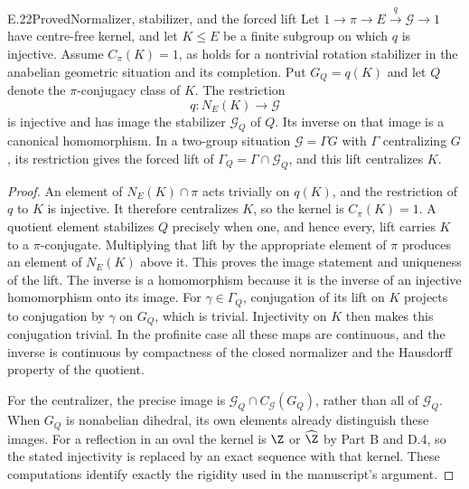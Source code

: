 \begin{claim}{E.22}{Proved}{Normalizer, stabilizer, and the forced lift}
Let $1\to\pi\to E\xrightarrow q\mathcal G\to1$ have centre-free kernel, and let $K\leq E$ be a finite subgroup on which $q$ is injective. Assume $C_\pi(K)=1$, as holds for a nontrivial rotation stabilizer in the anabelian geometric situation and its completion. Put $G_Q=q(K)$ and let $Q$ denote the $\pi$-conjugacy class of $K$. The restriction
\[
 q:N_E(K)\longrightarrow\mathcal G
\]
is injective and has image the stabilizer $\mathcal G_Q$ of $Q$. Its inverse on that image is a canonical homomorphism. In a two-group situation $\mathcal G=\Gamma G$ with $\Gamma$ centralizing $G$, its restriction gives the forced lift of $\Gamma_Q=\Gamma\cap\mathcal G_Q$, and this lift centralizes $K$.
\end{claim}
\begin{proof}
An element of $N_E(K)\cap\pi$ acts trivially on $q(K)$, and the restriction of $q$ to $K$ is injective. It therefore centralizes $K$, so the kernel is $C_\pi(K)=1$. A quotient element stabilizes $Q$ precisely when one, and hence every, lift carries $K$ to a $\pi$-conjugate. Multiplying that lift by the appropriate element of $\pi$ produces an element of $N_E(K)$ above it. This proves the image statement and uniqueness of the lift. The inverse is a homomorphism because it is the inverse of an injective homomorphism onto its image. For $\gamma\in\Gamma_Q$, conjugation of its lift on $K$ projects to conjugation by $\gamma$ on $G_Q$, which is trivial. Injectivity on $K$ then makes this conjugation trivial. In the profinite case all these maps are continuous, and the inverse is continuous by compactness of the closed normalizer and the Hausdorff property of the quotient.

For the centralizer, the precise image is $\mathcal G_Q\cap C_{\mathcal G}(G_Q)$, rather than all of $\mathcal G_Q$. When $G_Q$ is nonabelian dihedral, its own elements already distinguish these images. For a reflection in an oval the kernel is $\Z$ or $\widehat\Z$ by Part B and D.4, so the stated injectivity is replaced by an exact sequence with that kernel. These computations identify exactly the rigidity used in the manuscript's argument.
\end{proof}

